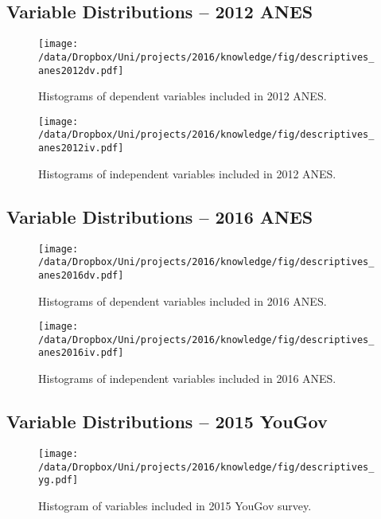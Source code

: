 \clearpage
\subsection{Variable Distributions -- 2012 ANES}
\begin{figure}[h]\centering
\texttt{[image: /data/Dropbox/Uni/projects/2016/knowledge/fig/descriptives\_anes2012dv.pdf]}
\caption[Histograms of dependent variables included in 2012 ANES]{Histograms of dependent variables included in 2012 ANES.}\label{fig:descriptives_anes2012dv}
\end{figure}

\begin{figure}[h]\centering
\texttt{[image: /data/Dropbox/Uni/projects/2016/knowledge/fig/descriptives\_anes2012iv.pdf]}
\caption[Histograms of independent variables included in 2012 ANES]{Histograms of independent variables included in 2012 ANES.}\label{fig:descriptives_anes2012iv}
\end{figure}

\clearpage
\subsection{Variable Distributions -- 2016 ANES}
\begin{figure}[h]\centering
\texttt{[image: /data/Dropbox/Uni/projects/2016/knowledge/fig/descriptives\_anes2016dv.pdf]}
\caption[Histograms of dependent variables included in 2016 ANES]{Histograms of dependent variables included in 2016 ANES.}\label{fig:descriptives_anes2016dv}
\end{figure}

\begin{figure}[h]\centering
\texttt{[image: /data/Dropbox/Uni/projects/2016/knowledge/fig/descriptives\_anes2016iv.pdf]}
\caption[Histograms of independent variables included in 2016 ANES]{Histograms of independent variables included in 2016 ANES.}\label{fig:descriptives_anes2016iv}
\end{figure}

\clearpage
\subsection{Variable Distributions -- 2015 YouGov}

\begin{figure}[h]\centering
\texttt{[image: /data/Dropbox/Uni/projects/2016/knowledge/fig/descriptives\_yg.pdf]}
\caption[Histogram of variables included in 2015 YouGov survey]{Histogram of variables included in 2015 YouGov survey.}\label{fig:descriptives_yg}
\end{figure}


